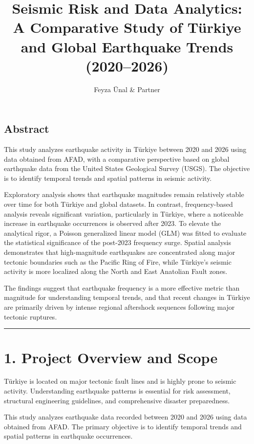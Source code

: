 \documentclass[
  11pt,
  a4paper,
  DIV=11,
  numbers=noendperiod]{scrartcl}
\title{Seismic Risk and Data Analytics: A Comparative Study of Türkiye
and Global Earthquake Trends (2020--2026)}
\author{Feyza Ünal \& Partner}
\date{}
\begin{document}
\maketitle


\subsection{Abstract}\label{abstract}

This study analyzes earthquake activity in Türkiye between 2020 and 2026
using data obtained from AFAD, with a comparative perspective based on
global earthquake data from the United States Geological Survey (USGS).
The objective is to identify temporal trends and spatial patterns in
seismic activity.

Exploratory analysis shows that earthquake magnitudes remain relatively
stable over time for both Türkiye and global datasets. In contrast,
frequency-based analysis reveals significant variation, particularly in
Türkiye, where a noticeable increase in earthquake occurrences is
observed after 2023. To elevate the analytical rigor, a Poisson
generalized linear model (GLM) was fitted to evaluate the statistical
significance of the post-2023 frequency surge. Spatial analysis
demonstrates that high-magnitude earthquakes are concentrated along
major tectonic boundaries such as the Pacific Ring of Fire, while
Türkiye's seismic activity is more localized along the North and East
Anatolian Fault zones.

The findings suggest that earthquake frequency is a more effective
metric than magnitude for understanding temporal trends, and that recent
changes in Türkiye are primarily driven by intense regional aftershock
sequences following major tectonic ruptures.

\begin{center}\rule{0.5\linewidth}{0.5pt}\end{center}

\section{1. Project Overview and
Scope}\label{project-overview-and-scope}

Türkiye is located on major tectonic fault lines and is highly prone to
seismic activity. Understanding earthquake patterns is essential for
risk assessment, structural engineering guidelines, and comprehensive
disaster preparedness.

This study analyzes earthquake data recorded between 2020 and 2026 using
data obtained from AFAD. The primary objective is to identify temporal
trends and spatial patterns in earthquake occurrences.
\end{document}
